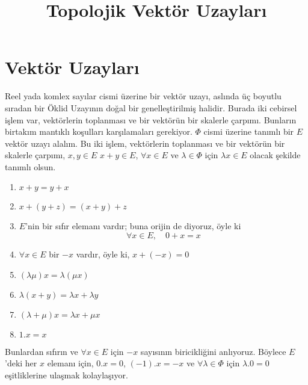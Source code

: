 \documentclass[11pt]{article}
\theoremstyle{plain}
\theoremstyle{definition}
\theoremstyle{remark}
\numberwithin{equation}{section}
\renewcommand{\%}{{\small \%}}
\begin{document}
\title{\bfseries { Topolojik Vektör Uzayları}}
\date{\vspace{-5ex}}


\maketitle

\section{Vektör Uzayları}\label{S:intro} 

Reel yada komlex sayılar cismi üzerine bir vektör uzayı, aslında üç boyutlu sıradan bir Öklid Uzayının doğal bir genelleştirilmiş halidir. Burada iki cebirsel işlem var, vektörlerin toplanması ve bir vektörün bir skalerle çarpımı. Bunların birtakım mantıklı koşulları karşılamaları gerekiyor. $\Phi$ cismi üzerine tanımlı bir $E$ vektör uzayı alalım. Bu iki işlem, vektörlerin toplanması ve bir vektörün bir skalerle çarpımı, $x,y\in E$  $x+y\in E$, $\forall x\in E $ ve $\lambda\in \Phi$ için $\lambda x\in E$ olacak şekilde tanımlı olsun.
\begin{enumerate}

\item \quad $x+y=y+x$ 
\item \quad $x+(y+z)=(x+y)+z$
\item \quad $E$'nin bir sıfır elemanı vardır; buna orijin de diyoruz, öyle ki
\[\forall x\in E,\quad 0+x=x\]
\item \quad $\forall x\in E$ bir $-x$ vardır, öyle ki, $x+(-x)=0$
\item \quad $(\lambda\mu)x=\lambda(\mu x)$
\item \quad $\lambda(x+y)=\lambda x+\lambda y$
\item \quad $(\lambda+\mu)x=\lambda x+\mu x$
\item \quad $1.x=x$
\end{enumerate}
Bunlardan sıfırın ve $\forall x\in E$ için $-x$ sayısının biricikliğini anlıyoruz. Böylece $E$'deki her $x$ elemanı için, $0.x=0$, $(-1).x=-x$ ve $\forall\lambda\in\Phi$ için $\lambda.0=0$ eşitliklerine ulaşmak kolaylaşıyor.\\[2pt]
\end{document}
